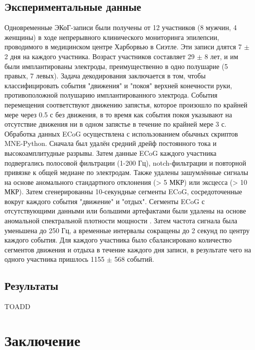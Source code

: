 \documentclass[a4paper, 12pt]{article}
\begin{document}
	\subsection{Экспериментальные данные}
	Одновременные ЭКоГ-записи были получены от 12 участников (8 мужчин, 4 женщины)
	в ходе непрерывного клинического мониторинга эпилепсии, проводимого в медицинском центре Харборвью в Сиэтле.
	Эти записи длятся 7 $\pm$ 2 дня на каждого участника. Возраст участников составляет 29 $\pm$ 8 лет, и им были имплантированы электроды, преимущественно в одно полушарие (5 правых, 7 левых).
	Задача декодирования заключается в том, чтобы классифицировать события "движения" и "покоя" верхней конечности руки, противоположной полушарию имплантированного электрода.
	События перемещения соответствуют движению запястья, которое произошло по крайней мере через 0.5 с без движения, в то время как события покоя указывают на отсутствие движения ни в одном запястье в течение по крайней мере 3 с.
	Обработка данных ECoG осуществлена с использованием обычных скриптов MNE-Python. 
	Сначала был удалён средний дрейф постоянного тока и высокоамплитудные разрывы. Затем данные ECoG каждого участника подвергались полосовой фильтрации (1-200 Гц), notch-фильтрации и повторной привязке к общей медиане по электродам. 
	Также удалены зашумлённые сигналы на основе аномального стандартного отклонения (> 5 МКР) или эксцесса (> 10 МКР). 
	Затем сгенерированны 10-секундные сегменты ECoG, сосредоточенные вокруг каждого события "движение" и "отдых". 
	Сегменты ECoG с отсутствующими данными или большими артефактами были удалены на основе аномальной спектральной плотности мощности \citep{peterson2021behavioral}.
	Затем частота сигнала была уменьшена до 250 Гц, а временные интервалы сокращены до 2 секунд по центру каждого события.
	Для каждого участника было сбалансировано количество сегментов движения и отдыха в течение каждого дня записи, в результате чего на одного участника пришлось 1155 $\pm$ 568 событий.
	
	\subsection{Результаты}
	TOADD
	
	\newpage
	\section*{Заключение}
	
\end{document}
